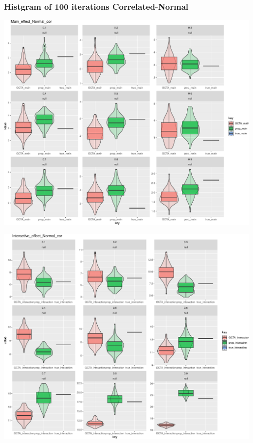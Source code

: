 \documentclass[]{article}
\begin{document}

\clearpage

\subsubsection{Histgram of 100 iterations
Correlated-Normal}\label{histgram-of-100-iterations-correlated-normal}

\includegraphics{Norl_cor_simulation_files/figure-latex/normal_main-1.pdf}

\includegraphics{Norl_cor_simulation_files/figure-latex/normal_inter-1.pdf}
\end{document}
